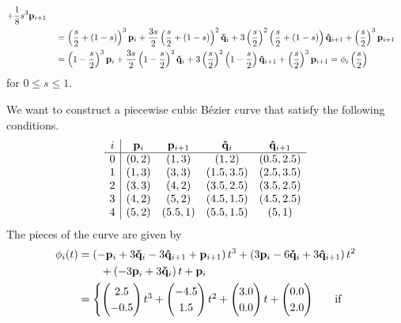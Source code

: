 \begin{rmk}
\begin{align*}
+ \frac{1}{8} s^3 \mathbf{p}_{i+1} \\
&\quad = \left( \frac{s}{2}+(1-s) \right)^3 \mathbf{p}_i +
\frac{3s}{2}\left(\frac{s}{2} + (1-s) \right)^2 \mathbf{\check{q}}_i +
3 \left( \frac{s}{2} \right)^2\left(\frac{s}{2}+(1-s) \right)
\mathbf{\hat{q}}_{i+1} + \left( \frac{s}{2} \right)^3 \mathbf{p}_{i+1} \\
&\quad = \left( 1 -\frac{s}{2}\right)^3 \mathbf{p}_i +
\frac{3s}{2}\left( 1- \frac{s}{2}\right)^2 \mathbf{\check{q}}_i +
3 \left( \frac{s}{2} \right)^2\left(1 - \frac{s}{2}\right) \mathbf{\hat{q}}_{i+1}
+ \left( \frac{s}{2} \right)^3 \mathbf{p}_{i+1}
= \mathbf{\phi}_i\left(\frac{s}{2}\right)
\end{align*}
for $0 \leq s \leq 1$.
\end{rmk}

\begin{egg}
We want to construct a piecewise cubic Bézier curve that satisfy the
following conditions.
\[
\begin{array}{c|cccc}
i & \mathbf{p}_i & \mathbf{p}_{i+1} & \mathbf{\check{q}}_i & \mathbf{\hat{q}}_{i+1} \\
\hline
0 & (0,2) & (1,3) & (1,2) & (0.5,2.5) \\
1 & (1,3) & (3,3) & (1.5,3.5) & (2.5,3.5) \\
2 & (3,3) & (4,2) & (3.5,2.5) & (3.5,2.5) \\  
3 & (4,2) & (5,2) & (4.5,1.5) & (4.5,2.5) \\
4 & (5,2) & (5.5,1) & (5.5,1.5) & (5,1)
\end{array}
\]
The pieces of the curve are given by
\begin{align*}
\mathbf{\phi}_i(t) &=
  \left(-\mathbf{p}_i +3\mathbf{\check{q}}_i - 3 \mathbf{\hat{q}}_{i+1} +
\mathbf{p}_{i+1}\right) t^3 + \left(3 \mathbf{p}_i -6 \mathbf{\check{q}}_i
+ 3 \mathbf{\hat{q}}_{i+1}\right) t^2 \\
&\qquad + \left(-3 \mathbf{p}_i + 3  \mathbf{\check{q}}_i\right) t + \mathbf{p}_i \\
&= \begin{cases}
\begin{pmatrix} 2.5 \\ -0.5 \end{pmatrix} t^3
+ \begin{pmatrix} -4.5 \\ 1.5 \end{pmatrix} t^2
+ \begin{pmatrix} 3.0 \\ 0.0 \end{pmatrix} t
+ \begin{pmatrix} 0.0 \\ 2.0 \end{pmatrix} & \quad \text{if}

\end{cases}
\end{align*}
\end{egg}
